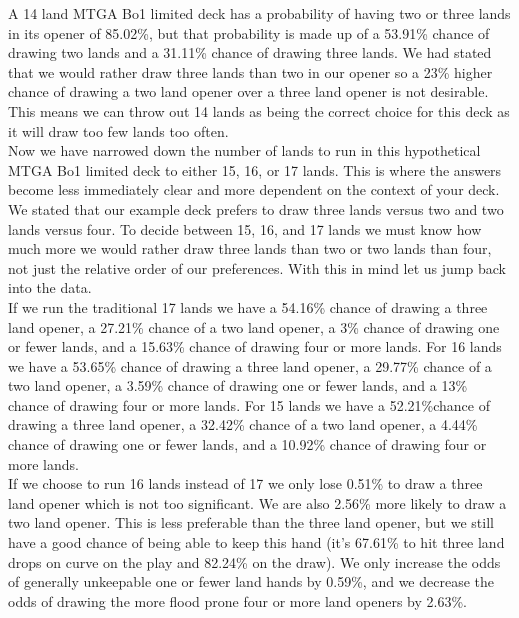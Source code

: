 \documentclass[oneside]{book}   %
\begin{document}
A 14 land MTGA Bo1 limited deck has a probability of having two or three lands in its opener of 85.02\%, but that probability is made up of a 53.91\% chance of drawing two lands and a 31.11\% chance of drawing three lands. We had stated that we would rather draw three lands than two in our opener so a 23\% higher chance of drawing a two land opener over a three land opener is not desirable. This means we can throw out 14 lands as being the correct choice for this deck as it will draw too few lands too often. \\

Now we have narrowed down the number of lands to run in this hypothetical MTGA Bo1 limited deck to either 15, 16, or 17 lands. This is where the answers become less immediately clear and more dependent on the context of your deck. We stated that our example deck prefers to draw three lands versus two and two lands versus four. To decide between 15, 16, and 17 lands we must know how much more we would rather draw three lands than two or two lands than four, not just the relative order of our preferences. With this in mind let us jump back into the data.\\

If we run the traditional 17 lands we have a 54.16\% chance of drawing a three land opener, a 27.21\% chance of a two land opener, a 3\% chance of drawing one or fewer lands, and a 15.63\% chance of drawing four or more lands. For 16 lands we have a 53.65\% chance of drawing a three land opener, a 29.77\% chance of a two land opener, a 3.59\% chance of drawing one or fewer lands, and a 13\% chance of drawing four or more lands. For 15 lands we have a 52.21\%chance of drawing a three land opener, a 32.42\% chance of a two land opener, a 4.44\% chance of drawing one or fewer lands, and a 10.92\% chance of drawing four or more lands.\\

If we choose to run 16 lands instead of 17 we only lose 0.51\% to draw a three land opener which is not too significant. We are also 2.56\% more likely to draw a two land opener. This is less preferable than the three land opener, but we still have a good chance of being able to keep this hand (it's 67.61\% to hit three land drops on curve on the play and 82.24\% on the draw). We only increase the odds of generally unkeepable one or fewer land hands by 0.59\%, and we decrease the odds of drawing the more flood prone four or more land openers by 2.63\%. \\
\end{document}

